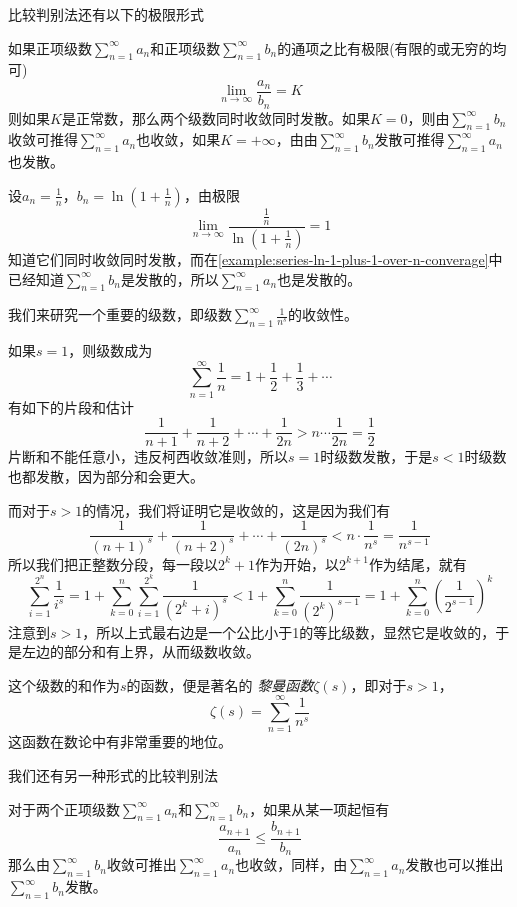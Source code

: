 比较判别法还有以下的极限形式
\begin{theorem}
  如果正项级数$\sum_{n=1}^{\infty}a_n$和正项级数$\sum_{n=1}^{\infty}b_n$的通项之比有极限(有限的或无穷的均可)
  \[ \lim_{n \to \infty} \frac{a_n}{b_n} = K \]
  则如果$K$是正常数，那么两个级数同时收敛同时发散。如果$K=0$，则由$\sum_{n=1}^{\infty}b_n$收敛可推得$\sum_{n=1}^{\infty}a_n$也收敛，如果$K=+\infty$，由由$\sum_{n=1}^{\infty}b_n$发散可推得$\sum_{n=1}^{\infty}a_n$也发散。
\end{theorem}

\begin{example}
  设$a_n=\frac{1}{n}$，$b_n=\ln{\left( 1+\frac{1}{n} \right)}$，由极限
  \[ \lim_{n \to \infty} \frac{\frac{1}{n}}{\ln{\left( 1+\frac{1}{n} \right)}} =1 \]
  知道它们同时收敛同时发散，而在\autoref{example:series-ln-1-plus-1-over-n-converage}中已经知道$\sum_{n=1}^{\infty}b_n$是发散的，所以$\sum_{n=1}^{\infty}a_n$也是发散的。
\end{example}


\begin{example}
  我们来研究一个重要的级数，即级数$\sum_{n=1}^{\infty}\frac{1}{n^s}$的收敛性。

  如果$s=1$，则级数成为
  \[ \sum_{n=1}^{\infty}\frac{1}{n} = 1+\frac{1}{2} + \frac{1}{3} + \cdots \]
  有如下的片段和估计
  \[ \frac{1}{n+1} + \frac{1}{n+2} + \cdots + \frac{1}{2n} > n \cdots \frac{1}{2n} = \frac{1}{2} \]
  片断和不能任意小，违反柯西收敛准则，所以$s=1$时级数发散，于是$s<1$时级数也都发散，因为部分和会更大。

  而对于$s>1$的情况，我们将证明它是收敛的，这是因为我们有
  \[ \frac{1}{(n+1)^s} + \frac{1}{(n+2)^s} + \cdots + \frac{1}{(2n)^s} < n \cdot \frac{1}{n^s} = \frac{1}{n^{s-1}} \]
  所以我们把正整数分段，每一段以$2^k+1$作为开始，以$2^{k+1}$作为结尾，就有
  \[ \sum_{i=1}^{2^n}\frac{1}{i^s} = 1+\sum_{k=0}^n \sum_{i=1}^{2^k} \frac{1}{(2^k+i)^s} < 1+\sum_{k=0}^n \frac{1}{(2^k)^{s-1}} =  1+\sum_{k=0}^n \left( \frac{1}{2^{s-1}} \right)^k \]
  注意到$s>1$，所以上式最右边是一个公比小于1的等比级数，显然它是收敛的，于是左边的部分和有上界，从而级数收敛。

  这个级数的和作为$s$的函数，便是著名的 \emph{黎曼函数}$\zeta(s)$，即对于$s>1$，
  \[ \zeta (s) = \sum_{n=1}^{\infty} \frac{1}{n^s} \]
  这函数在数论中有非常重要的地位。
\end{example}



我们还有另一种形式的比较判别法
\begin{theorem}
  对于两个正项级数$\sum_{n=1}^{\infty}a_n$和$\sum_{n=1}^{\infty}b_n$，如果从某一项起恒有
  \[ \frac{a_{n+1}}{a_n} \leqslant \frac{b_{n+1}}{b_n} \]
  那么由$\sum_{n=1}^{\infty}b_n$收敛可推出$\sum_{n=1}^{\infty}a_n$也收敛，同样，由$\sum_{n=1}^{\infty}a_n$发散也可以推出$\sum_{n=1}^{\infty}b_n$发散。
\end{theorem}

